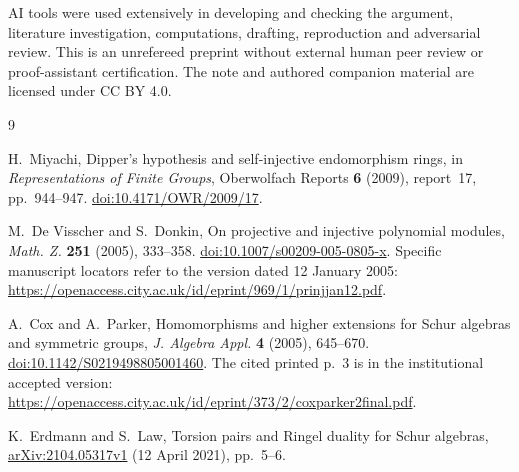 \documentclass[11pt]{article}
\begin{document}
AI tools were used extensively in developing and checking the argument,
literature investigation, computations, drafting, reproduction and
adversarial review. This is an unrefereed preprint without external human
peer review or proof-assistant certification. The note and authored
companion material are licensed under CC BY 4.0.

\begin{thebibliography}{9}
\raggedright
{}
H.~Miyachi,
Dipper's hypothesis and self-injective endomorphism rings,
in \emph{Representations of Finite Groups},
Oberwolfach Reports \textbf{6} (2009), report~17, pp.~944--947.
\href{https://doi.org/10.4171/OWR/2009/17}{doi:10.4171/OWR/2009/17}.

M.~De Visscher and S.~Donkin,
On projective and injective polynomial modules,
\emph{Math. Z.} \textbf{251} (2005), 333--358.
\href{https://doi.org/10.1007/s00209-005-0805-x}{doi:10.1007/s00209-005-0805-x}.
Specific manuscript locators refer to the version dated 12 January 2005:
\url{https://openaccess.city.ac.uk/id/eprint/969/1/prinjjan12.pdf}.

A.~Cox and A.~Parker,
Homomorphisms and higher extensions for Schur algebras and symmetric groups,
\emph{J. Algebra Appl.} \textbf{4} (2005), 645--670.
\href{https://doi.org/10.1142/S0219498805001460}{doi:10.1142/S0219498805001460}.
The cited printed p.~3 is in the institutional accepted version:
\url{https://openaccess.city.ac.uk/id/eprint/373/2/coxparker2final.pdf}.

K.~Erdmann and S.~Law,
Torsion pairs and Ringel duality for Schur algebras,
\href{https://arxiv.org/abs/2104.05317v1}{arXiv:2104.05317v1} (12 April 2021),
pp.~5--6.
\end{thebibliography}
\end{document}
